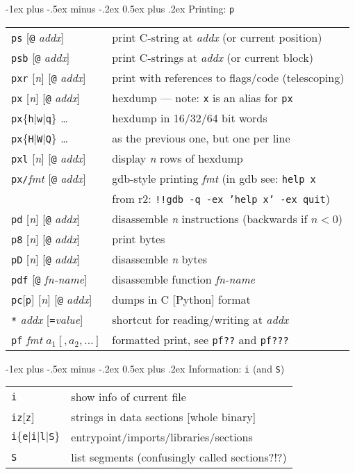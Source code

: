\documentclass[a4paper,landscape]{article}
\makeatletter
\renewcommand{\section}{\@startsection{section}{1}{0mm}%
                                {-1ex plus -.5ex minus -.2ex}%
                                {0.5ex plus .2ex}%
                                {\normalfont\large\bfseries}}
\makeatother
\begin{document}
\begin{multicols*}{3}
\section{Printing: \texttt{p}}
\begin{tabular}{@{}ll@{}}
\texttt{ps} [\texttt{@} \textit{addx}]& print C-string at \textit{addx} (or current position) \\
\texttt{psb} [\texttt{@} \textit{addx}]& print C-strings at \textit{addx} (or current block) \\
\texttt{pxr} [\textit{n}] [\texttt{@} \textit{addx}] & print with references to flags/code (telescoping) \\
\texttt{px} [\textit{n}] [\texttt{@} \textit{addx}] & hexdump --- note: \texttt{x} is an alias for \texttt{px}\\
\texttt{px}$\{$\texttt{h}$|$\texttt{w}$|$\texttt{q}$\}$ \ldots & hexdump in 16/32/64 bit words \\
\texttt{px}$\{$\texttt{H}$|$\texttt{W}$|$\texttt{Q}$\}$ \ldots & as the previous one, but one per line \\
\texttt{pxl} [\textit{n}] [\texttt{@} \textit{addx}] & display \textit{n} rows of hexdump \\
\texttt{px/}\textit{fmt} [\texttt{@} \textit{addx}] & gdb-style printing \textit{fmt} (in gdb see: \texttt{help x} \\ & from r2: \texttt{!!gdb -q -ex 'help x' -ex quit}) \\
\texttt{pd} [\textit{n}] [\texttt{@} \textit{addx}] & disassemble \textit{n} instructions (backwards if $n<0$) \\
\texttt{p8} [\textit{n}] [\texttt{@} \textit{addx}] & print bytes \\
\texttt{pD} [\textit{n}] [\texttt{@} \textit{addx}] & disassemble \textit{n} bytes \\
\texttt{pdf} [\texttt{@} \textit{fn-name}] & disassemble function \textit{fn-name} \\
\texttt{pc}[\texttt{p}] [\textit{n}] [\texttt{@} \textit{addx}] & dumps in C [Python] format \\
\texttt{*} \textit{addx} [\texttt{=}\textit{value}] & shortcut for reading/writing at \textit{addx} \\
\texttt{pf} \textit{fmt} $a_1 [,a_2,\dots]$ & formatted print, see \texttt{pf??} and \texttt{pf???} \\
\end{tabular}

\section{Information: \texttt{i} (and \texttt{S})}
\begin{tabular}{@{}ll@{}}
\texttt{i} & show info of current file \\
\texttt{iz}[\texttt{z}] & strings in data sections [whole binary] \\
\texttt{i}$\{$\texttt{e}$|$\texttt{i}$|$\texttt{l}$|$\texttt{S}$\}$ & entrypoint/imports/libraries/sections \\
\texttt{S} & list segments (confusingly called sections?!?) \\
\end{tabular}


\end{multicols*}
\end{document}
